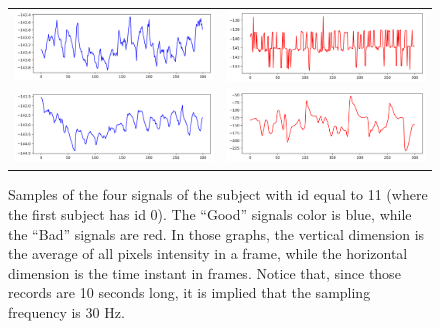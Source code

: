 
\begin{figure}
	\begin{tabular}{cc}
		\includegraphics[width=0.45\linewidth]{img/samples/butppg_111001.png} 
			& \includegraphics[width=0.45\linewidth]{img/samples/butppg_111003.png} \\
		\includegraphics[width=0.45\linewidth]{img/samples/butppg_111002.png} 
			& \includegraphics[width=0.45\linewidth]{img/samples/butppg_111004.png} \\
	\end{tabular}
	\caption{Samples of the four signals of the subject with id equal to 11 (where the first subject has id 0). The ``Good'' signals color is blue, while the ``Bad'' signals are red. In those graphs, the vertical dimension is the average of all pixels intensity in a frame, while the horizontal dimension is the time instant in frames. Notice that, since those records are 10 seconds long, it is implied that the sampling frequency is 30 Hz.}
	\label{fig:butppg_samples}
\end{figure}
